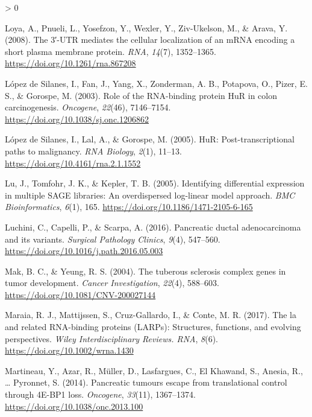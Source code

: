\documentclass[
  12pt,
  openany]{book}
\newlength{\cslhangindent}
\newenvironment{CSLReferences}[2] %
 {%
  \setlength{\parindent}{0pt}
  \ifodd #1 \everypar{\setlength{\hangindent}{\cslhangindent}}\ignorespaces\fi
  \ifnum #2 > 0
  \setlength{\parskip}{#2\baselineskip}
  \fi
 }%
 {}
\begin{document}
\begin{CSLReferences}{1}{0}
\leavevmode\hypertarget{ref-Loya2008}{}%
Loya, A., Pnueli, L., Yosefzon, Y., Wexler, Y., Ziv-Ukelson, M., \& Arava, Y. (2008). The 3′-{UTR} mediates the cellular localization of an {mRNA} encoding a short plasma membrane protein. \emph{{RNA}}, \emph{14}(7), 1352--1365. \url{https://doi.org/10.1261/rna.867208}

\leavevmode\hypertarget{ref-LopezdeSilanes2003}{}%
López de Silanes, I., Fan, J., Yang, X., Zonderman, A. B., Potapova, O., Pizer, E. S., \& Gorospe, M. (2003). Role of the {RNA}-binding protein {HuR} in colon carcinogenesis. \emph{Oncogene}, \emph{22}(46), 7146--7154. \url{https://doi.org/10.1038/sj.onc.1206862}

\leavevmode\hypertarget{ref-LopezdeSilanes2005}{}%
López de Silanes, I., Lal, A., \& Gorospe, M. (2005). {HuR}: Post-transcriptional paths to malignancy. \emph{{RNA} Biology}, \emph{2}(1), 11--13. \url{https://doi.org/10.4161/rna.2.1.1552}

\leavevmode\hypertarget{ref-Lu2005}{}%
Lu, J., Tomfohr, J. K., \& Kepler, T. B. (2005). Identifying differential expression in multiple {SAGE} libraries: An overdispersed log-linear model approach. \emph{{BMC} Bioinformatics}, \emph{6}(1), 165. \url{https://doi.org/10.1186/1471-2105-6-165}

\leavevmode\hypertarget{ref-Luchini2016}{}%
Luchini, C., Capelli, P., \& Scarpa, A. (2016). Pancreatic ductal adenocarcinoma and its variants. \emph{Surgical Pathology Clinics}, \emph{9}(4), 547--560. \url{https://doi.org/10.1016/j.path.2016.05.003}

\leavevmode\hypertarget{ref-Mak2004}{}%
Mak, B. C., \& Yeung, R. S. (2004). The tuberous sclerosis complex genes in tumor development. \emph{Cancer Investigation}, \emph{22}(4), 588--603. \url{https://doi.org/10.1081/CNV-200027144}

\leavevmode\hypertarget{ref-Maraia2017}{}%
Maraia, R. J., Mattijssen, S., Cruz-Gallardo, I., \& Conte, M. R. (2017). The la and related {RNA}-binding proteins ({LARPs}): Structures, functions, and evolving perspectives. \emph{Wiley Interdisciplinary Reviews. {RNA}}, \emph{8}(6). \url{https://doi.org/10.1002/wrna.1430}

\leavevmode\hypertarget{ref-Martineau2014}{}%
Martineau, Y., Azar, R., Müller, D., Lasfargues, C., El Khawand, S., Anesia, R., \ldots{} Pyronnet, S. (2014). Pancreatic tumours escape from translational control through 4E-{BP}1 loss. \emph{Oncogene}, \emph{33}(11), 1367--1374. \url{https://doi.org/10.1038/onc.2013.100}


\end{CSLReferences}
\end{document}

